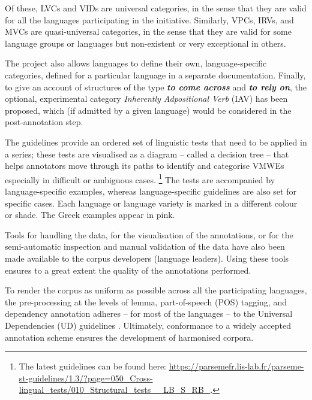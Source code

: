 \documentclass[output=paper,colorlinks,citecolor=brown]{langscibook}
\begin{document}
Of these, LVCs and VIDs are universal categories, in the sense that they are valid for all the languages participating in the initiative. Similarly, VPCs, IRVs, and MVCs are quasi-universal categories, in the sense that they are valid for some language groups or languages but non-existent or very exceptional in others.


The project also allows languages to define their own, language-specific categories, defined for a particular language in a separate documentation.
Finally, to give an account of structures of the type \textbf{\em{to come across}} and \textbf{\em{to rely on}}, the optional, experimental category \textit{Inherently Adpositional Verb} (IAV) has been proposed, which (if admitted by a given language) would be considered in the post-annotation step.

The guidelines provide an ordered set of linguistic tests that need to be applied in a series; these tests are visualised as a diagram -- called a decision tree -- that helps annotators move through its paths to identify and categorise VMWEs \textemdash especially in difficult or ambiguous cases. 
\footnote{The latest guidelines can be found here: \url{https://parsemefr.lis-lab.fr/parseme-st-guidelines/1.3/?page=050_Cross-lingual_tests/010_Structural_tests__LB_S_RB_}.}
The tests are accompanied by language-specific examples, whereas language-specific guidelines are also set for specific cases. Each language or language variety is marked in a different colour or shade. The Greek examples appear in pink.

Tools for handling the data, for the visualisation of the annotations, or for the semi-automatic inspection and manual validation of the data have also been made available to the corpus developers (language leaders). Using these tools ensures to a great extent the quality of the annotations performed.


To render the corpus as uniform as possible across all the participating languages, the pre-processing at the levels of lemma, part-of-speech (POS) tagging, and dependency annotation adheres -- for most of the languages -- to the Universal Dependencies (UD) guidelines \citep{nivre-etal-2020-universal}. Ultimately, conformance to a widely accepted annotation scheme ensures the development of harmonised corpora. 
\end{document}

